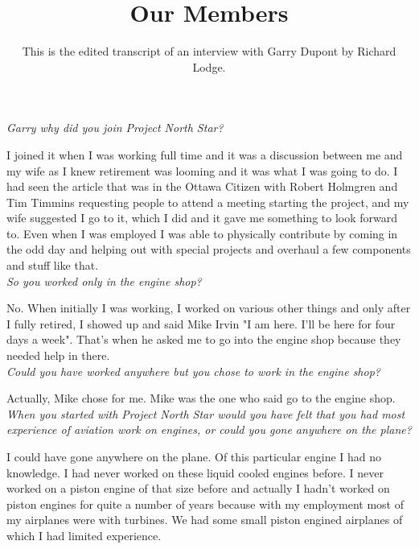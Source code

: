 %


\title{Our Members}
\author{This is the edited transcript of an interview with Garry Dupont by Richard Lodge.}

\maketitle

\textit{Garry why did you join Project North Star?}

I joined it when I was working full time and it was a discussion between me and
my wife as I knew retirement was looming and it was what I was going to do. I
had seen the article that was in the Ottawa Citizen with Robert Holmgren and Tim
Timmins requesting people to attend a meeting starting the project, and my wife
suggested I go to it, which I did and it gave me something to look forward to.
Even when I was employed I was able to physically contribute by coming in the
odd day and helping out with special projects and overhaul a few components and
stuff like that.\\

\noindent\textit{So you worked only in the engine shop?}

No.  When initially I was working, I worked on various other things and only
after I fully retired, I showed up and said Mike Irvin "I am here. I'll be here
for four days a week".  That's when he asked me to go into the engine shop
because they needed help in there.\\

\noindent\textit{Could you have worked anywhere but you chose to work in the engine shop?}

Actually, Mike chose for me.  Mike was the one who said go to the engine shop.\\

\noindent\textit{When you started with Project North Star would you have felt
that you had most experience of aviation work on engines, or could you gone
anywhere on the plane?}

I could have gone anywhere on the plane. Of this particular engine I had no
knowledge. I had never worked on these liquid cooled engines before.  I never
worked on a piston engine of that size before and actually I hadn't worked on
piston engines for quite a number of years because with my employment most of my
airplanes were with turbines.  We had some small piston engined airplanes of
which I had limited experience.\\

